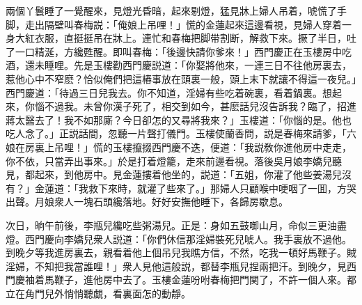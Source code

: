 兩個丫鬟睡了一覺醒來，見燈光昏暗，起來剔燈，猛見牀上婦人吊着，唬慌了手脚，走出隔壁叫春梅説：「俺娘上吊哩！」慌的金蓮起來這邊看視，見婦人穿着一身大紅衣服，直挺挺吊在牀上。連忙和春梅把脚带割断，解救下來。撅了半日，吐了一口精涎，方纔甦醒。即叫春梅：「後邊快請你爹來！」西門慶正在玉樓房中吃酒，還未睡哩。先是玉樓勸西門慶説道：「你娶將他來，一連三日不往他房裏去，惹他心中不窄麽？恰似俺們把這樁事放在頭裏一般，頭上末下就讓不得這一夜兒。」西門慶道：「待過三日兒我去。你不知道，淫婦有些吃着碗裏，看着鍋裏。想起來，你惱不過我。未曾你漢子死了，相交到如今，甚麽話兒沒告訴我？臨了，招進蔣太醫去了！我不如那廝？今日卻怎的又尋將我來？」玉樓道：「你惱的是。他也吃人念了。」正説話間，忽聽一片聲打儀門。玉樓使蘭香問，説是春梅來請爹，「六娘在房裏上吊哩！」慌的玉樓攛掇西門慶不迭，便道：「我説敎你進他房中走走，你不依，只當弄出事來。」於是打着燈籠，走來前邊看視。落後吳月娘李嬌兒聽見，都起來，到他房中。見金蓮摟着他坐的，説道：「五姐，你灌了他些姜湯兒沒有？」金蓮道：「我救下來時，就灌了些來了。」那婦人只顧喉中哽咽了一囬，方哭出聲。月娘衆人一塊石頭纔落地。好好安撫他睡下，各歸房歇息。

次日，晌午前後，李瓶兒纔吃些粥湯兒。正是：身如五鼓啣山月，命似三更油盡燈。西門慶向李嬌兒衆人説道：「你們休信那淫婦裝死兒唬人。我手裏放不過他。到晚夕等我進房裏去，親看着他上個吊兒我瞧方信，不然，吃我一頓好馬鞭子。賊淫婦，不知把我當誰哩！」衆人見他這般説，都替李瓶兒捏兩把汗。到晚夕，見西門慶袖着馬鞭子，進他房中去了。玉樓金蓮吩咐春梅把門関了，不許一個人來。都立在角門兒外悄悄聽覷，看裏面怎的動靜。

